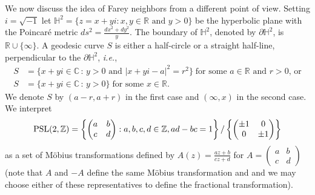 \documentclass[graybox]{svmult}
\begin{document}
We now discuss the idea of Farey neighbors from a different point of view. Setting $i=\sqrt{-1}$ let $\mathbb H^{2}=\{ z = x + yi: x, y \in \mathbb R \,\,\mbox{and} \,\,y> 0\}$ be the hyperbolic plane with the Poincar\'{e} metric $ds^2 = \tfrac{dx^2+dy^2}{y}$.  
The boundary of $\mathbb H^{2}$, denoted by $\partial \mathbb H^{2}$, is $\mathbb R \cup \{\infty\}$.  A geodesic curve $S$ is either a half-circle or a straight half-line, perpendicular to the $\partial \mathbb H^{2}$, {\em i.e.},
\[
\begin{split}
S &= \big\{x+ yi\in \mathbb{C}\,: \, y>0\text{ and }  |x+yi - a|^{2} = r^{2}\big\} \;  \text{for some $a\in \mathbb{R}$ and $r>0$, or} \\
S &= \{x + yi \in \mathbb{C} \,:\, y>0\} \;  \text{for some $x\in \mathbb{R}$}.  
\end{split}
\]
We denote $S$ by $(a - r, a + r)$ in the first case and $(\infty,  x)$ in the second case. We interpret 
\[
{\rm PSL}(2, \mathbb Z) = \left\{\begin{pmatrix} a & b \\c & d \end{pmatrix} : 
a, b, c, d \in \mathbb Z, ad-bc = 1 \right\} /\left\{ \begin{pmatrix}\pm 1 & 0 \\ 0 &\pm 1 
\end{pmatrix} \right\}
\] 
as a set of M\"obius transformations defined by  $A(z) = \tfrac{a z + b}{cz + d}$ for $A = \begin{pmatrix}a & b \\ c & d \end{pmatrix}$ 
(note that $A$ and $-A$ define the same M\"obius transformation and and we may choose either of these representatives to define the fractional transformation). 
\end{document}
